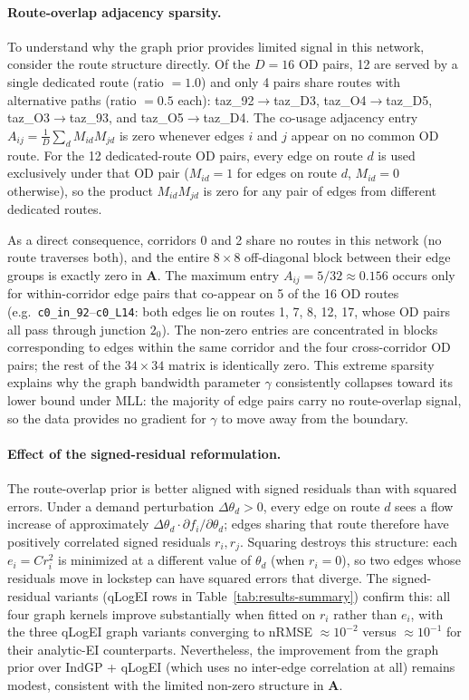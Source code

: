 \documentclass[11pt]{article}
\begin{document}
\paragraph{Route-overlap adjacency sparsity.}
To understand why the graph prior provides limited signal in this network,
consider the route structure directly.
Of the $D=16$ OD pairs, 12 are served by a single dedicated route (ratio $=1.0$)
and only 4 pairs share routes with alternative paths (ratio $=0.5$ each):
taz\_92$\to$taz\_D3, taz\_O4$\to$taz\_D5, taz\_O3$\to$taz\_93, and
taz\_O5$\to$taz\_D4.
The co-usage adjacency entry $A_{ij} = \frac{1}{D}\sum_d M_{id}M_{jd}$ is
zero whenever edges $i$ and $j$ appear on no common OD route.
For the 12 dedicated-route OD pairs, every edge on route $d$ is used
exclusively under that OD pair ($M_{id}=1$ for edges on route $d$,
$M_{id}=0$ otherwise), so the product $M_{id}M_{jd}$ is zero for any
pair of edges from different dedicated routes.

As a direct consequence, corridors 0 and 2 share no routes in this network
(no route traverses both), and the entire $8\times 8$ off-diagonal block
between their edge groups is exactly zero in $\mathbf{A}$.
The maximum entry $A_{ij} = 5/32 \approx 0.156$ occurs only for
within-corridor edge pairs that co-appear on 5 of the 16 OD routes
(e.g.\ \texttt{c0\_in\_92}--\texttt{c0\_L14}: both edges lie on routes
1, 7, 8, 12, 17, whose OD pairs all pass through junction $2_0$).
The non-zero entries are concentrated in blocks corresponding to edges
within the same corridor and the four cross-corridor OD pairs; the rest
of the $34\times34$ matrix is identically zero.
This extreme sparsity explains why the graph bandwidth parameter $\gamma$
consistently collapses toward its lower bound under MLL: the majority of
edge pairs carry no route-overlap signal, so the data provides no gradient
for $\gamma$ to move away from the boundary.

\paragraph{Effect of the signed-residual reformulation.}
The route-overlap prior is better aligned with signed residuals than with
squared errors. Under a demand perturbation $\Delta\theta_d > 0$, every
edge on route $d$ sees a flow increase of approximately
$\Delta\theta_d \cdot \partial f_i / \partial \theta_d$; edges sharing that
route therefore have positively correlated signed residuals $r_i, r_j$.
Squaring destroys this structure: each $e_i = C r_i^2$ is minimized at a
different value of $\theta_d$ (when $r_i = 0$), so two edges whose residuals
move in lockstep can have squared errors that diverge.
The signed-residual variants (qLogEI rows in Table~\ref{tab:results-summary})
confirm this: all four graph kernels improve substantially when fitted on
$r_i$ rather than $e_i$, with the three qLogEI graph variants converging
to nRMSE $\approx 10^{-2}$ versus $\approx 10^{-1}$ for their analytic-EI
counterparts.  Nevertheless, the improvement from the graph prior
over IndGP + qLogEI (which uses no inter-edge correlation at all) remains
modest, consistent with the limited non-zero structure in $\mathbf{A}$.
\end{document}
